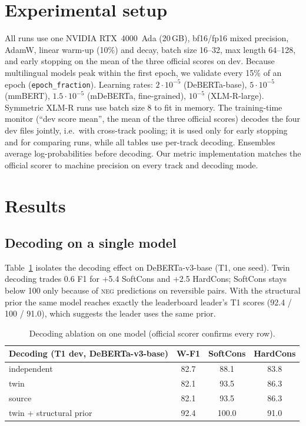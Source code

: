 \documentclass[11pt,a4paper]{article}
\newcommand{\NEG}{\textsc{neg}}
\begin{document}
\section{Experimental setup}
All runs use one NVIDIA RTX~4000~Ada (20\,GB), bf16/fp16 mixed precision,
AdamW, linear warm-up (10\%) and decay, batch size 16--32, max length 64--128,
and early stopping on the mean of the three official scores on dev. Because
multilingual models peak within the first epoch, we validate every 15\% of an
epoch (\texttt{epoch\_fraction}). Learning rates: $2\cdot10^{-5}$ (DeBERTa-base),
$5\cdot10^{-5}$ (mmBERT), $1.5\cdot10^{-5}$ (mDeBERTa, fine-grained), $10^{-5}$
(XLM-R-large). Symmetric XLM-R runs use batch size 8 to fit in memory.
The training-time monitor (``dev score mean'', the mean of the three official
scores) decodes the four dev files jointly, i.e.\ with cross-track pooling; it
is used only for early stopping and for comparing runs, while all tables use
per-track decoding. Ensembles average log-probabilities before decoding. Our metric
implementation matches the official scorer to machine precision on every
track and decoding mode.

\section{Results}

\subsection{Decoding on a single model}
Table~\ref{tab:e1} isolates the decoding effect on DeBERTa-v3-base (T1, one seed).
Twin decoding trades 0.6 F1 for +5.4 SoftCons and +2.5 HardCons; SoftCons
stays below 100 only because of \NEG{} predictions on reversible pairs. With the
structural prior the same model reaches exactly the leaderboard leader's T1
scores (92.4 / 100 / 91.0), which suggests the leader uses the same prior.

\begin{table}[h]
\centering\small
\begin{tabular}{lccc}
\toprule
Decoding (T1 dev, DeBERTa-v3-base) & W-F1 & SoftCons & HardCons \\
\midrule
independent & 82.7 & 88.1 & 83.8 \\
twin        & 82.1 & 93.5 & 86.3 \\
source      & 82.1 & 93.5 & 86.3 \\
twin + structural prior & 92.4 & 100.0 & 91.0 \\
\bottomrule
\end{tabular}
\caption{Decoding ablation on one model (official scorer confirms every row).}
\label{tab:e1}
\end{table}
\end{document}
